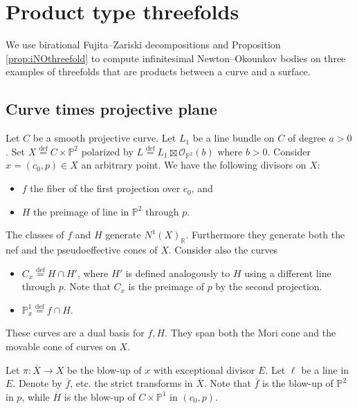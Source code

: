 \documentclass[12pt]{amsart}
\theoremstyle{definition}
\newcommand{\bb}{\ensuremath{\mathfrak{b}}}
\newcommand{\deq}{\ensuremath{\stackrel{\textrm{def}}{=}}}
\newcommand{\?}{ \circled{{\large\bf ?}}}
\let\cal\mathcal
\let\bb\mathbb
\begin{document}
\section{Product type threefolds}

We use birational Fujita--Zariski decompositions and Proposition \ref{prop:iNOthreefold} to compute infinitesimal Newton--Okounkov bodies on three examples of threefolds that are products between a curve and a surface.

\subsection{Curve times projective plane}
Let $C$ be a smooth projective curve. Let $L_1$ be a line bundle on $C$ of degree $a>0$. 
Set $X\deq C\times\bb P^2$ polarized by $L\deq L_1\boxtimes\cal O_{\bb P^2}(b)$ where $b>0$. Consider $x=(c_0,p)\in X$ an arbitrary point.
We have the following divisors on $X$:
\begin{itemize}
	\item $f$ the fiber of the first projection over $c_0$, and 
	\item $H$ the preimage of line in $\bb P^2$ through $p$.
\end{itemize}
The classes of $f$ and $H$ generate $N^1(X)_{\bb R}$. Furthermore they generate both the nef and the pseudoeffective cones of $X$.
Consider also the curves 
\begin{itemize} 
\item $C_x\deq H\cap H'$, where $H'$ is defined analogously to $H$ using a different line through $p$. Note that $C_x$ is the preimage of $p$ by the second projection.
\item $\bb P^1_x\deq f\cap H$. 
\end{itemize} 
These curves are a dual basis for $f,H$. They span both the Mori cone and the movable cone of curves on $X$.

Let $\pi:\overline X\to X$ be the blow-up of $x$ with exceptional divisor $E$. Let $\ell$ be a line in $E$. Denote by $\overline f$, etc. the strict transforms in $\overline X$. Note that $\overline f$ is the blow-up of $\bb P^2$ in $p$, while $\overline H$ is the blow-up of $C\times\bb P^1$ in $(c_0,p)$.
\end{document}
